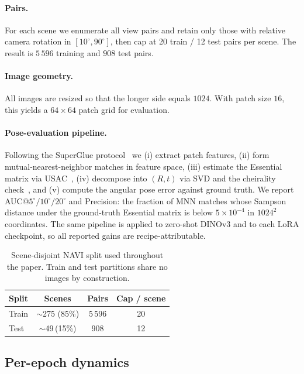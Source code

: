 \documentclass[10pt,twocolumn,letterpaper]{article}
\begin{document}
\paragraph{Pairs.} For each scene we enumerate all view pairs and
retain only those with relative camera rotation in
$[10^\circ, 90^\circ]$, then cap at 20 train / 12 test pairs per
scene. The result is $5\,596$ training and $908$ test pairs.

\paragraph{Image geometry.} All images are resized so that the longer
side equals $1024$. With patch size $16$, this yields a $64\times64$
patch grid for evaluation.

\paragraph{Pose-evaluation pipeline.} Following the SuperGlue
protocol~\cite{superglue} we (i) extract patch features, (ii) form
mutual-nearest-neighbor matches in feature space, (iii) estimate the
Essential matrix via USAC~\cite{usac}, (iv) decompose into $(R,t)$ via
SVD and the cheirality check~\cite{nister2004}, and (v) compute the
angular pose error against ground truth. We report
AUC@$5^\circ\!/10^\circ\!/20^\circ$ and Precision: the fraction of
MNN matches whose Sampson distance under the ground-truth
Essential matrix is below $5\!\times\!10^{-4}$ in $1024^2$
coordinates. The same pipeline is applied to zero-shot DINOv3 and to
each LoRA checkpoint, so all reported gains are recipe-attributable.

\begin{table}[t]
\centering\small
\caption{Scene-disjoint NAVI split used throughout the paper.
Train and test partitions share no images by construction.}
\label{tab:split}
\begin{tabular}{@{}lccc@{}}
\toprule
\textbf{Split} & \textbf{Scenes} & \textbf{Pairs} & \textbf{Cap / scene}\\
\midrule
Train & $\sim$275 (85\%) & 5\,596 & 20 \\
Test  & $\sim$49\,(15\%) & 908   & 12 \\
\bottomrule
\end{tabular}
\end{table}

\subsection{Per-epoch dynamics}
\end{document}

